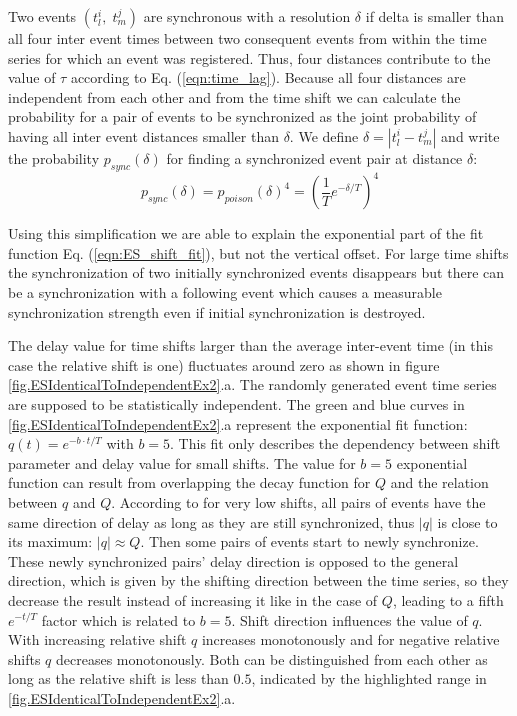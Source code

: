 \documentclass[a4paper,10pt]{scrbook}
\begin{document}
Two events $(t_l^i,\;t_m^j)$ are synchronous with a resolution $\delta$ if delta is smaller than all four inter event times between two consequent events from within the time series for which an event was registered. Thus, four distances contribute to the value of $\tau$ according to Eq. (\ref{eqn:time_lag}). Because all four distances are independent from each other and from the time shift we can calculate the probability for a pair of events to be synchronized as the joint probability of having all inter event distances smaller than $\delta$. We define $\delta = |t_l^i-t_m^j|$ and write the probability $p_{sync}(\delta)$ for finding a synchronized event pair at distance $\delta$:
\begin{equation}
p_{sync}(\delta) = p_{poison}(\delta) ^ 4 = \left( \frac{1}{T}e^{-\delta/T} \right)^4
\end{equation}

Using this simplification we are able to explain the exponential part of the fit function Eq.  (\ref{eqn:ES_shift_fit}), but not the vertical offset. For large time shifts the synchronization of two initially synchronized events disappears but there can be a synchronization with a following event which causes a measurable synchronization strength even if initial synchronization is destroyed. 

The delay value for time shifts larger than the average inter-event time (in this case the relative shift is one) fluctuates around zero as shown in figure \ref{fig.ESIdenticalToIndependentEx2}.a. The randomly generated event time series are supposed to be statistically independent. 
The green and blue curves in \ref{fig.ESIdenticalToIndependentEx2}.a represent the exponential fit function: $q(t)=e^{-b \cdot t/T}$ with $b=5$. This fit only describes the dependency between shift parameter and delay value for small shifts. The value for $b=5$ exponential function can result from overlapping the decay function for $Q$ and the relation between $q$ and $Q$. According to \cite{Boeker2012} for very low shifts, all pairs of events have the same direction of delay as long as they are still synchronized, thus $|q|$ is close to its maximum: $|q| \approx Q$. Then some pairs of events start to newly synchronize. These newly synchronized pairs' delay direction is opposed to the general direction, which is given by the shifting direction between the time series, so they decrease the result instead of increasing it like in the case of $Q$, leading to a fifth $e^{-t/T}$ factor which is related to $b=5$. Shift direction influences the value of $q$. With increasing relative shift $q$ increases  monotonously and for negative relative shifts $q$ decreases monotonously. Both can be distinguished from each other as long as the relative shift is less than $0.5$, indicated by the highlighted range in \ref{fig.ESIdenticalToIndependentEx2}.a. 
\end{document}
